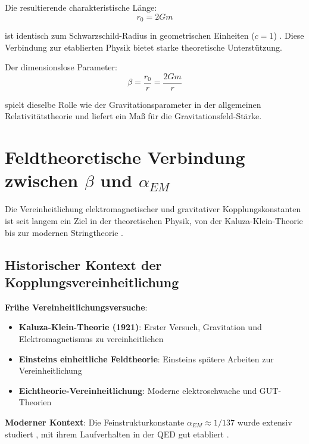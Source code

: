 \documentclass[12pt,a4paper]{article}
\begin{document}
	Die resultierende charakteristische Länge:
	\begin{equation}
		\boxed{r_0 = 2Gm}
	\end{equation}
	
	ist identisch zum Schwarzschild-Radius in geometrischen Einheiten ($c = 1$) \citep{misner1973,carroll2004}. Diese Verbindung zur etablierten Physik bietet starke theoretische Unterstützung.
	
	Der dimensionslose Parameter:
	\begin{equation}
		\boxed{\beta = \frac{r_0}{r} = \frac{2Gm}{r}}
	\end{equation}
	
	spielt dieselbe Rolle wie der Gravitationsparameter in der allgemeinen Relativitätstheorie \citep{weinberg1972} und liefert ein Maß für die Gravitationsfeld-Stärke.
	
	\section{Feldtheoretische Verbindung zwischen $\beta$ und $\alpha_{EM}$}
	\label{sec:beta_alpha_connection}
	
	Die Vereinheitlichung elektromagnetischer und gravitativer Kopplungskonstanten ist seit langem ein Ziel in der theoretischen Physik, von der Kaluza-Klein-Theorie \citep{kaluza1921,klein1926} bis zur modernen Stringtheorie \citep{green1987,polchinski1998}.
	
	\subsection{Historischer Kontext der Kopplungsvereinheitlichung}
	\label{subsec:coupling_unification_history}
	
	\textbf{Frühe Vereinheitlichungsversuche}:
	\begin{itemize}
		\item \textbf{Kaluza-Klein-Theorie (1921)}: Erster Versuch, Gravitation und Elektromagnetismus zu vereinheitlichen \citep{kaluza1921,klein1926}
		\item \textbf{Einsteins einheitliche Feldtheorie}: Einsteins spätere Arbeiten zur Vereinheitlichung \citep{einstein1955}
		\item \textbf{Eichtheorie-Vereinheitlichung}: Moderne elektroschwache \citep{weinberg1967,salam1968} und GUT-Theorien \citep{georgi1974}
	\end{itemize}
	
	\textbf{Moderner Kontext}:
	Die Feinstrukturkonstante $\alpha_{EM} \approx 1/137$ wurde extensiv studiert \citep{sommerfeld1916,feynman1985}, mit ihrem Laufverhalten in der QED gut etabliert \citep{peskin1995}.
	
\end{document}
